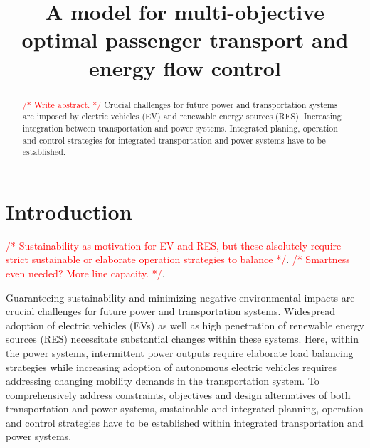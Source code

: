 \documentclass[conference]{IEEEtran}
\newcommand{\todo}[1]{\textcolor{red}{/* #1 */}}
\begin{document}
	
	\title{A model for multi-objective optimal passenger transport and energy flow control}
	
	\author{
		\and
		\and
	}

	\maketitle
	
	\begin{abstract}
		\todo{Write abstract.}
	Crucial challenges for future power and transportation systems are imposed by electric vehicles (EV) and renewable energy sources (RES).	
	Increasing integration between transportation and power systems.
	Integrated planing, operation and control strategies for integrated transportation and power systems have to be established.
		
	\end{abstract}
	
	\section{Introduction}
	\todo{Sustainability as motivation for EV and RES, but these alsolutely require strict sustainable or elaborate operation strategies to balance}. 
	\todo{Smartness even needed? More line capacity.}. 
	
	Guaranteeing sustainability and minimizing negative environmental impacts are crucial challenges for future power and transportation systems. Widespread adoption of electric vehicles (EVs) as well as high penetration of renewable energy sources (RES) necessitate substantial changes within these systems. Here, within the power systems, intermittent power outputs require elaborate load balancing strategies while increasing adoption of autonomous electric vehicles requires addressing changing mobility demands in the transportation system. To comprehensively address constraints, objectives and design alternatives of both transportation and power systems, sustainable and integrated planning, operation and control strategies have to be established within integrated transportation and power systems.
	
\end{document}
